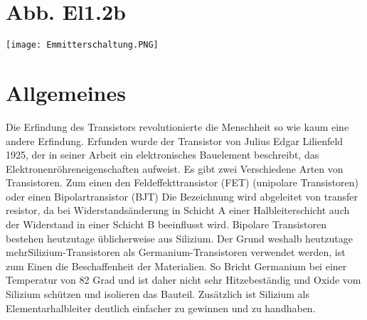 \section{Abb. El1.2b}
\begin{center}
    \texttt{[image: Emmitterschaltung.PNG]}
\end{center}
\section{Allgemeines}
Die Erfindung des Transistors revolutionierte die Menschheit so wie kaum eine andere
Erfindung.
Erfunden wurde der Transistor von Julius Edgar Lilienfeld 1925, der in seiner Arbeit ein
elektronisches Bauelement beschreibt, das Elektronenröhreneigenschaften aufweist.
Es gibt zwei Verschiedene Arten von Transistoren. Zum einen den Feldeffekttransistor (FET)
(unipolare Transistoren) oder einen Bipolartransistor (BJT)
Die Bezeichnung wird abgeleitet von transfer resistor, da bei Widerstandsänderung in Schicht A
einer Halbleiterschicht auch der Widerstand in einer Schicht B beeinflusst wird.
Bipolare Transistoren bestehen heutzutage üblicherweise aus Silizium. Der Grund weshalb heutzutage mehrSilizium-Transistoren als Germanium-Transistoren verwendet werden, ist zum Einen  die Beschaffenheit der Materialien. So Bricht Germanium bei einer Temperatur von 82 Grad und ist daher nicht sehr Hitzebeständig und Oxide vom Silizium schützen und isolieren das Bauteil. Zusätzlich ist Silizium als Elementarhalbleiter deutlich einfacher zu gewinnen und zu handhaben.
